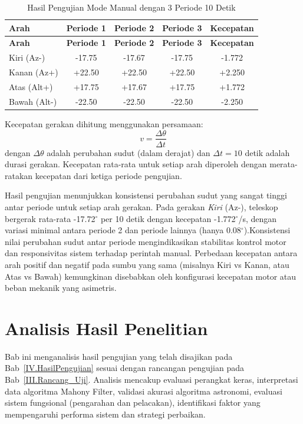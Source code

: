 \begin{longtable}{|l|c|c|c|c|}
    \caption{Hasil Pengujian Mode Manual dengan 3 Periode 10 Detik}
    \label{table:4.manual_test} \\
    \hline
    \textbf{Arah} & \textbf{Periode 1} & \textbf{Periode 2} & \textbf{Periode 3} & \textbf{Kecepatan} \\
    \hline
    \endfirsthead
    \hline
    \textbf{Arah} & \textbf{Periode 1} & \textbf{Periode 2} & \textbf{Periode 3} & \textbf{Kecepatan} \\
    \hline
    \endhead
    \hline
    \endfoot
    \hline
    \endlastfoot

    Kiri (Az-) & -17.75 & -17.67 & -17.75 & -1.772 \\ \hline
    Kanan (Az+) & +22.50 & +22.50 & +22.50 & +2.250 \\ \hline
    Atas (Alt+) & +17.75 & +17.67 & +17.75 & +1.772 \\ \hline
    Bawah (Alt-) & -22.50 & -22.50 & -22.50 & -2.250 \\ \hline
\end{longtable}

Kecepatan gerakan dihitung menggunakan persamaan:
{\setlength{\abovedisplayskip}{8pt}%
	\setlength{\belowdisplayskip}{8pt}%
\[
v = \frac{\Delta\theta}{\Delta t}
\]}
dengan $\Delta\theta$ adalah perubahan sudut (dalam derajat) dan $\Delta t = 10$ detik adalah durasi gerakan. Kecepatan rata-rata untuk setiap arah diperoleh dengan merata-ratakan kecepatan dari ketiga periode pengujian. \par

Hasil pengujian menunjukkan konsistensi perubahan sudut yang sangat tinggi antar periode untuk setiap arah gerakan. Pada gerakan \textit{Kiri} (Az-), teleskop bergerak rata-rata -17.72$^\circ$ per 10 detik dengan kecepatan -1.772$^\circ$/s, dengan variasi minimal antara periode 2 dan periode lainnya (hanya 0.08$^\circ$).Konsistensi nilai perubahan sudut antar periode mengindikasikan stabilitas kontrol motor dan responsivitas sistem terhadap perintah manual. Perbedaan kecepatan antara arah positif dan negatif pada sumbu yang sama (misalnya Kiri vs Kanan, atau Atas vs Bawah) kemungkinan disebabkan oleh konfigurasi kecepatan motor atau beban mekanik yang asimetris. 
\section{Analisis Hasil Penelitian} \label{IV.Analisis}

Bab ini menganalisis hasil pengujian yang telah disajikan pada Bab~\ref{IV.HasilPengujian} sesuai dengan rancangan pengujian pada Bab~\ref{III.Rancang_Uji}. Analisis mencakup evaluasi perangkat keras, interpretasi data algoritma Mahony Filter, validasi akurasi algoritma astronomi, evaluasi sistem fungsional (pengarahan dan pelacakan), identifikasi faktor yang mempengaruhi performa sistem dan strategi perbaikan. \par

